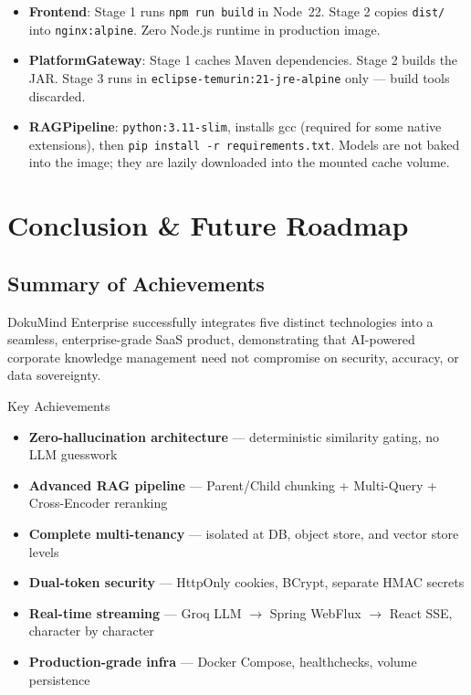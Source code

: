\documentclass[12pt,a4paper]{report}
\begin{document}
\begin{itemize}
  \item \textbf{Frontend}: Stage 1 runs \texttt{npm run build} in Node~22. Stage 2 copies \texttt{dist/} into \texttt{nginx:alpine}. Zero Node.js runtime in production image.
  \item \textbf{PlatformGateway}: Stage 1 caches Maven dependencies. Stage 2 builds the JAR. Stage 3 runs in \texttt{eclipse-temurin:21-jre-alpine} only — build tools discarded.
  \item \textbf{RAGPipeline}: \texttt{python:3.11-slim}, installs gcc (required for some native extensions), then \texttt{pip install -r requirements.txt}. Models are not baked into the image; they are lazily downloaded into the mounted cache volume.
\end{itemize}

\clearpage
\chapter{Conclusion \& Future Roadmap}

\section{Summary of Achievements}

DokuMind Enterprise successfully integrates five distinct technologies into a seamless, enterprise-grade SaaS product, demonstrating that AI-powered corporate knowledge management need not compromise on security, accuracy, or data sovereignty.

\begin{conceptbox}{Key Achievements}
\begin{itemize}[noitemsep]
  \item \textbf{Zero-hallucination architecture} — deterministic similarity gating, no LLM guesswork
  \item \textbf{Advanced RAG pipeline} — Parent/Child chunking + Multi-Query + Cross-Encoder reranking
  \item \textbf{Complete multi-tenancy} — isolated at DB, object store, and vector store levels
  \item \textbf{Dual-token security} — HttpOnly cookies, BCrypt, separate HMAC secrets
  \item \textbf{Real-time streaming} — Groq LLM $\to$ Spring WebFlux $\to$ React SSE, character by character
  \item \textbf{Production-grade infra} — Docker Compose, healthchecks, volume persistence
\end{itemize}
\end{conceptbox}
\end{document}
